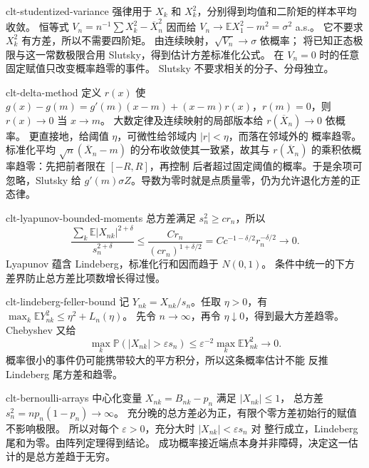 \begin{solution}{clt-studentized-variance}
强律用于 $X_k$ 和 $X_k^2$，分别得到均值和二阶矩的样本平均收敛。
恒等式 $V_n=n^{-1}\sum X_k^2-\overline X_n^2$ 因而给
$V_n\to\mathbb EX_1^2-m^2=\sigma^2$ a.s.。
它不要求 $X_k^2$ 有方差，所以不需要四阶矩。
由连续映射，$\sqrt{V_n}\to\sigma$ 依概率；
将已知正态极限与这一常数极限合用 Slutsky，得到估计方差标准化公式。
在 $V_n=0$ 时的任意固定赋值只改变概率趋零的事件。
Slutsky 不要求相关的分子、分母独立。
\end{solution}

\begin{solution}{clt-delta-method}
定义 $r(x)$ 使
$g(x)-g(m)=g'(m)(x-m)+(x-m)r(x)$，$r(m)=0$，则 $r(x)\to0$ 当 $x\to m$。
大数定律及连续映射的局部版本给 $r(\overline X_n)\to0$ 依概率。
更直接地，给阈值 $\eta$，可微性给邻域内 $|r|<\eta$，而落在邻域外的
概率趋零。
标准化平均 $\sqrt n(\overline X_n-m)$ 的分布收敛使其一致紧，故其与
$r(\overline X_n)$ 的乘积依概率趋零：先把前者限在 $[-R,R]$，再控制
后者超过固定阈值的概率。于是余项可忽略，Slutsky 给
$g'(m)\sigma Z$。导数为零时就是点质量零，仍为允许退化方差的正态律。
\end{solution}

\begin{solution}{clt-lyapunov-bounded-moments}
总方差满足 $s_n^2\ge cr_n$，所以
\[
 \frac{\sum_k\mathbb E|X_{nk}|^{2+\delta}}{s_n^{2+\delta}}
 \le\frac{Cr_n}{(cr_n)^{1+\delta/2}}
 =Cc^{-1-\delta/2}r_n^{-\delta/2}\longrightarrow0.
\]
Lyapunov 蕴含 Lindeberg，标准化行和因而趋于 $N(0,1)$。
条件中统一的下方差界防止总方差比项数增长得过慢。
\end{solution}

\begin{solution}{clt-lindeberg-feller-bound}
记 $Y_{nk}=X_{nk}/s_n$。任取 $\eta>0$，有
$\max_k\mathbb EY_{nk}^2\le\eta^2+L_n(\eta)$。
先令 $n\to\infty$，再令 $\eta\downarrow0$，得到最大方差趋零。
Chebyshev 又给
\[
 \max_k\mathbb P(|X_{nk}|>\varepsilon s_n)
 \le\varepsilon^{-2}\max_k\mathbb EY_{nk}^2\longrightarrow0.
\]
概率很小的事件仍可能携带较大的平方积分，所以这条概率估计不能
反推 Lindeberg 尾方差和趋零。
\end{solution}

\begin{solution}{clt-bernoulli-arrays}
中心化变量 $X_{nk}=B_{nk}-p_n$ 满足 $|X_{nk}|\le1$，
总方差 $s_n^2=np_n(1-p_n)\to\infty$。
充分晚的总方差必为正，有限个零方差初始行的赋值不影响极限。
所以对每个 $\varepsilon>0$，充分大时 $|X_{nk}|<\varepsilon s_n$ 对
整行成立，Lindeberg 尾和为零。由阵列定理得到结论。
成功概率接近端点本身并非障碍，决定这一估计的是总方差趋于无穷。
\end{solution}

